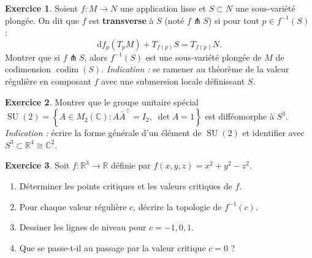 \documentclass[12pt,a4paper,openany]{book}
\theoremstyle{definition}
\newtheorem{exercice}{Exercice}[chapter]
\theoremstyle{plain}
\theoremstyle{remark}
\newcommand{\R}{\mathbb{R}}
\newcommand{\C}{\mathbb{C}}
\DeclareMathOperator{\SU}{SU}
\newcommand{\dd}{\mathrm{d}}
\newcommand{\set}[1]{\left\{#1\right\}}
\begin{document}
\begin{exercice}\label{exo:preimage-transverse}
Soient $f : M \to N$ une application lisse et $S \subset N$ une sous-variété plongée.
On dit que $f$ est \textbf{transverse} à $S$ (noté $f \pitchfork S$) si pour tout
$p \in f^{-1}(S)$ :
\[
  \dd f_p(T_pM) + T_{f(p)}S = T_{f(p)}N.
\]
Montrer que si $f \pitchfork S$, alors $f^{-1}(S)$ est une sous-variété plongée
de $M$ de codimension $\operatorname{codim}(S)$.
\textit{Indication :} se ramener au théorème de la valeur régulière en composant
$f$ avec une submersion locale définissant $S$.
\end{exercice}

\begin{exercice}\label{exo:SU2-S3}
\index{SU(2)@$\SU(2)$}
Montrer que le groupe unitaire spécial $\SU(2) = \set{A \in M_2(\C) : A\bar{A}^\top = I_2,\; \det A = 1}$
est difféomorphe à $S^3$. \textit{Indication :} écrire la forme générale d'un
élément de $\SU(2)$ et identifier avec $S^3 \subset \R^4 \cong \C^2$.
\end{exercice}

\begin{exercice}\label{exo:niveau-morse}
Soit $f : \R^3 \to \R$ définie par $f(x,y,z) = x^2 + y^2 - z^2$.
\begin{enumerate}[label=(\alph*)]
  \item Déterminer les points critiques et les valeurs critiques de $f$.
  \item Pour chaque valeur régulière $c$, décrire la topologie de $f^{-1}(c)$.
  \item Dessiner les lignes de niveau pour $c = -1, 0, 1$.
  \item Que se passe-t-il au passage par la valeur critique $c = 0$ ?
\end{enumerate}
\end{exercice}
\end{document}

